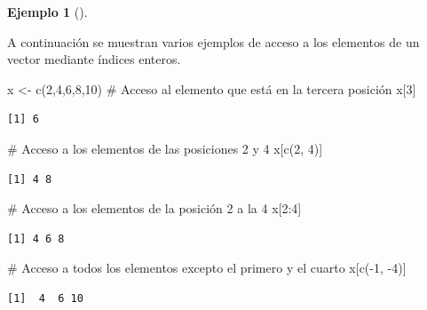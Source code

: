 \documentclass[
  a4paper,
]{scrreport}
\newenvironment{Shaded}{\begin{snugshade}}{\end{snugshade}}
\newcommand{\CommentTok}[1]{\textcolor[rgb]{0.37,0.37,0.37}{#1}}
\newcommand{\DecValTok}[1]{\textcolor[rgb]{0.68,0.00,0.00}{#1}}
\newcommand{\FunctionTok}[1]{\textcolor[rgb]{0.28,0.35,0.67}{#1}}
\newcommand{\NormalTok}[1]{\textcolor[rgb]{0.00,0.23,0.31}{#1}}
\newcommand{\OtherTok}[1]{\textcolor[rgb]{0.00,0.23,0.31}{#1}}
\newcommand{\SpecialCharTok}[1]{\textcolor[rgb]{0.37,0.37,0.37}{#1}}
\theoremstyle{definition}
\theoremstyle{definition}
\newtheorem{example}{Ejemplo}[chapter]
\theoremstyle{remark}
\begin{document}
\leavevmode{}%
\begin{example}[]\label{exm-acceso-vector}

A continuación se muestran varios ejemplos de acceso a los elementos de
un vector mediante índices enteros.

\begin{Shaded}
\begin{Highlighting}[]
\NormalTok{x }\OtherTok{\textless{}{-}} \FunctionTok{c}\NormalTok{(}\DecValTok{2}\NormalTok{,}\DecValTok{4}\NormalTok{,}\DecValTok{6}\NormalTok{,}\DecValTok{8}\NormalTok{,}\DecValTok{10}\NormalTok{)}
\CommentTok{\# Acceso al elemento que está en la tercera posición}
\NormalTok{x[}\DecValTok{3}\NormalTok{]}
\end{Highlighting}
\end{Shaded}

\begin{verbatim}
[1] 6
\end{verbatim}

\begin{Shaded}
\begin{Highlighting}[]
\CommentTok{\# Acceso a los elementos de las posiciones 2 y 4}
\NormalTok{x[}\FunctionTok{c}\NormalTok{(}\DecValTok{2}\NormalTok{, }\DecValTok{4}\NormalTok{)]}
\end{Highlighting}
\end{Shaded}

\begin{verbatim}
[1] 4 8
\end{verbatim}

\begin{Shaded}
\begin{Highlighting}[]
\CommentTok{\# Acceso a los elementos de la posición 2 a la 4}
\NormalTok{x[}\DecValTok{2}\SpecialCharTok{:}\DecValTok{4}\NormalTok{]}
\end{Highlighting}
\end{Shaded}

\begin{verbatim}
[1] 4 6 8
\end{verbatim}

\begin{Shaded}
\begin{Highlighting}[]
\CommentTok{\# Acceso a todos los elementos excepto el primero y el cuarto}
\NormalTok{x[}\FunctionTok{c}\NormalTok{(}\SpecialCharTok{{-}}\DecValTok{1}\NormalTok{, }\SpecialCharTok{{-}}\DecValTok{4}\NormalTok{)]}
\end{Highlighting}
\end{Shaded}

\begin{verbatim}
[1]  4  6 10
\end{verbatim}

\end{example}
\end{document}
